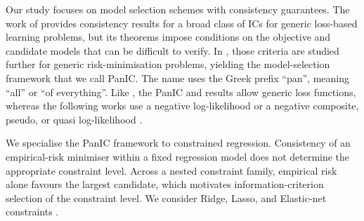 \documentclass[12pt]{article}
\newcommand{\blue}[1]{\textcolor[rgb]{0.00,0.00,1.00}{#1}}
\theoremstyle{remark}
\theoremstyle{plain}
\begin{document}
Our study focuses on model selection schemes with consistency guarantees. The work of \cite{sin_information_1996} provides consistency results for a broad class of ICs for generic loss-based learning problems, but its theorems impose conditions on the objective and candidate models that can be difficult to verify. In \cite{nguyen_panic:_2023}, those criteria are studied further for generic risk-minimisation problems, yielding the model-selection framework that we call PanIC. The name uses the Greek prefix ``pan'', meaning ``all'' or ``of everything''. Like \cite{baudry2015estimation}, the PanIC and \cite{sin_information_1996} results allow generic loss functions, whereas the following works use a negative log-likelihood \citep{leroux_consistent_1992, hui_order_2015} or a negative composite, pseudo, or quasi log-likelihood \citep{varin_note_2005, gao_composite_2010, ng_model_2014, hui_use_2021}.

\blue{We specialise the PanIC framework to constrained regression. Consistency of an empirical-risk minimiser within a fixed regression model does not determine the appropriate constraint level. Across a nested constraint family, empirical risk alone favours the largest candidate, which motivates information-criterion selection of the constraint level. We consider Ridge, Lasso, and Elastic-net constraints \citep{hoerl_ridge_1970,tibshirani_regression_1996,zou_regularization_2005}.}
\end{document}

